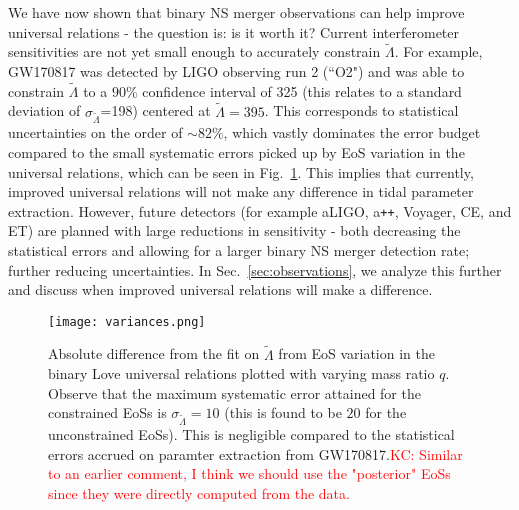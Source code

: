 \documentclass[prd,twocolumn,nofootinbib,superscriptaddress,amsmath,amssymb]{revtex4-1}
\newcommand{\kc}[1]{\textcolor{red}{KC: #1} }
\begin{document}
We have now shown that binary NS merger observations can help improve universal relations - the question is: is it worth it?
Current interferometer sensitivities are not yet small enough to accurately constrain $\tilde{\Lambda}$.
For example, GW170817 was detected by LIGO observing run 2 (``O2") and was able to constrain $\tilde{\Lambda}$ to a $90\%$ confidence interval of 325 (this relates to a standard deviation of $\sigma_{\tilde{\Lambda}}$=198) centered at $\tilde{\Lambda}=395$.
This corresponds to statistical uncertainties on the order of $\sim 82\%$, which vastly dominates the error budget compared to the small systematic errors picked up by EoS variation in the universal relations, which can be seen in Fig.~\ref{fig:variances}.
This implies that currently, improved universal relations will not make any difference in tidal parameter extraction.
However, future detectors (for example aLIGO, a\texttt{++}, Voyager, CE, and ET) are planned with large reductions in sensitivity - both decreasing the statistical errors and allowing for a larger binary NS merger detection rate; further reducing uncertainties.
In Sec.~\ref{sec:observations}, we analyze this further and discuss when improved universal relations will make a difference.
\begin{figure}
\begin{center} 
\texttt{[image: variances.png]}
\end{center}
\caption{
Absolute difference from the fit on $\tilde{\Lambda}$ from EoS variation in the binary Love universal relations plotted with varying mass ratio $q$.
Observe that the maximum systematic error attained for the constrained EoSs is $\sigma_{\tilde{\Lambda}}=10$ (this is found to be $20$ for the unconstrained EoSs).
This is negligible compared to the statistical errors accrued on paramter extraction from GW170817.\kc{Similar to an earlier comment, I think we should use the "posterior" EoSs since they were directly computed from the data.}
}
\label{fig:variances}
\end{figure}

\end{document}
